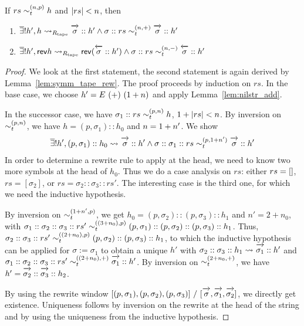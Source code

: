 \begin{lemma}\label{lem:tape_add}
  If $rs \sim_t^{(n, p)} h$ and $|rs| < n$, then 
  \begin{enumerate}
    \item $\mexists h', h \strent{\Rtape} \polpos{\sigma} :: h' \land \sigma :: rs \reprtt{n}{+} \polpos{\sigma} :: h'$ 
    \item $\mexists h', \rev{h} \strent{\Rtape} \rev{(\polneg{\sigma} :: h')} \land \sigma :: rs \reprtt{n}{-} \polneg{\sigma} :: h'$
  \end{enumerate}
\end{lemma}
\begin{proof}
  We look at the first statement, the second statement is again derived by Lemma~\ref{lem:symm_tape_rew}. 
  The proof proceeds by induction on $rs$. In the base case, we choose $h' = E~(+)~(1 +{n})$ and apply Lemma~\ref{lem:nilstr_add}. 

  In the successor case, we have $\sigma_1 :: rs \sim_t^{(p, n)} h$, $1 +{|rs|} < n$. By inversion on $\sim_t^{(p, n)}$, we have $h = (p, \sigma_1) :: h_0$ and $n = 1 +{n'}$. We show 
  \begin{align*}
    \mexists h', (p, \sigma_1) :: h_0 \strent{} \polpos{\sigma} :: h' \land \sigma::\sigma_1 ::rs \reprtt{p}{\natS{n'}} \polpos{\sigma} :: h'  
  \end{align*}
  In order to determine a rewrite rule to apply at the head, we need to know two more symbols at the head of $h_0$. Thus we do a case analysis on $rs$: either $rs = []$, $rs = [\sigma_2]$, or $rs = \sigma_2 :: \sigma_3 :: rs'$. The interesting case is the third one, for which we need the inductive hypothesis. 

  By inversion on $\sim_t^{(1 +{n'}, p)}$, we get $h_0 = (p, \sigma_2) :: (p, \sigma_3) :: h_1$ and $n' = 2 + n_0$, with $\sigma_1 :: \sigma_2 :: \sigma_3 :: rs' \sim_t^{((3 + n_0), p)} (p, \sigma_1) :: (p, \sigma_2) :: (p, \sigma_3) :: h_1$. 
  Thus, $\sigma_2 :: \sigma_3 :: rs' \sim_t^{((2 + n_0), p)} (p, \sigma_2) :: (p, \sigma_3) :: h_1$, 
  to which the inductive hypothesis can be applied for $\sigma := \sigma_1$ to obtain a unique $h'$ 
  with $\sigma_2 :: \sigma_3 :: h_1 \strent{} \polpos{\sigma_1} :: h'$ and $\sigma_1 :: \sigma_2 :: \sigma_3 :: rs' \reprtt{(2 + n_0)}{+} \polpos{\sigma_1} :: h'$. By inversion on $\sim_t^{(2+n_0, +)}$, we have $h' = \polpos{\sigma_2} :: \polpos{\sigma_3} :: h_2$. 

  By using the rewrite window $\irewwin{(p, \sigma_1)}{(p, \sigma_2)}{(p, \sigma_3)}{\polpos{\sigma}}{\polpos{\sigma_1}}{\polpos{\sigma_2}}$, we directly get existence. 
  Uniqueness follows by inversion on the rewrite at the head of the string and by using the uniqueness from the inductive hypothesis.
\end{proof}

